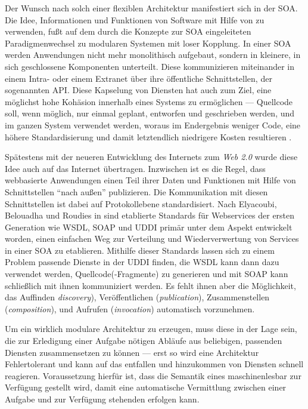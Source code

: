 \label{l:soa}Der Wunsch nach solch einer flexiblen Architektur manifestiert sich in der \ac{SOA}. Die Idee, Informationen und Funktionen von Software mit Hilfe von \ws zu verwenden, fußt auf dem durch die Konzepte zur \ac{SOA} eingeleiteten Paradigmenwechsel zu modularen Systemen mit loser Kopplung. In einer \ac{SOA} werden Anwendungen nicht mehr monolithisch aufgebaut, sondern in kleinere, in sich geschlossene Komponenten unterteilt. Diese kommunizieren miteinander in einem Intra- oder einem Extranet über ihre öffentliche Schnittstellen, der sogenannten \ac{API}. Diese Kapselung von Diensten hat auch zum Ziel, eine möglichst hohe Kohäsion innerhalb eines Systems zu ermöglichen --- Quellcode soll, wenn möglich, nur einmal geplant, entworfen und geschrieben werden, und im ganzen System verwendet werden, woraus im Endergebnis weniger Code, eine höhere Standardisierung und damit letztendlich niedrigere Kosten resultieren \cite{hn-web20}. 

Spätestens mit der neueren Entwicklung des Internets zum \emph{Web 2.0} wurde diese Idee auch auf das Internet übertragen. Inzwischen ist es die Regel, dass webbasierte Anwendungen einen Teil ihrer Daten und Funktionen mit Hilfe von Schnittstellen "`nach außen"' publizieren. Die Kommunikation mit diesen Schnittstellen ist dabei auf Protokollebene standardisiert. Nach Elyacoubi, Belouadha und Roudies in \cite{ei-sawsdl} sind etablierte Standards für Webservices der ersten Generation wie \ac{WSDL}, \ac{SOAP} und \ac{UDDI} primär unter dem Aspekt entwickelt worden, einen einfachen Weg zur Verteilung und Wiederverwertung von Services in einer \ac{SOA} zu etablieren. Mithilfe dieser Standards lassen sich zu einem Problem passende Dienste in der \ac{UDDI} finden, die \ac{WSDL} kann dann dazu verwendet werden, Quellcode(-Fragmente) zu generieren und mit \ac{SOAP} kann schließlich mit ihnen kommuniziert werden. Es fehlt ihnen aber die Möglichkeit, das Auffinden \emph{discovery}), Veröffentlichen (\emph{publication}), Zusammenstellen (\emph{composition}), und Aufrufen (\emph{invocation}) automatisch vorzunehmen. \cite[S.653]{ei-sawsdl}

\label{l:intro-loosecoupling}Um ein wirklich modulare Architektur zu erzeugen, muss diese in der Lage sein, die zur Erledigung einer Aufgabe nötigen Abläufe aus beliebigen, passenden Diensten zusammensetzen zu können --- erst so wird eine Architektur Fehlertolerant und kann auf das entfallen und hinzukommen von Diensten schnell reagieren. Voraussetzung hierfür ist, dass die Semantik eines \ws maschinenlesbar zur Verfügung gestellt wird, damit eine automatische Vermittlung zwischen einer Aufgabe und zur Verfügung stehenden \ws erfolgen kann.

